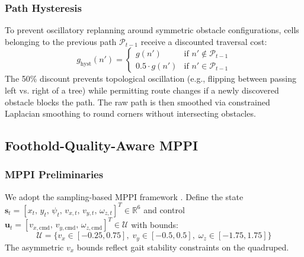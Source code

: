 \documentclass[letterpaper, 10 pt, conference]{ieeeconf}  %
\begin{document}
\subsubsection{Path Hysteresis}
To prevent oscillatory replanning around symmetric obstacle configurations, cells belonging to the previous path $\mathcal{P}_{t-1}$ receive a discounted traversal cost:
\begin{equation}
g_{\text{hyst}}(n') = \begin{cases} g(n') & \text{if } n' \notin \mathcal{P}_{t-1} \\ 0.5 \cdot g(n') & \text{if } n' \in \mathcal{P}_{t-1} \end{cases} \label{eq:hysteresis}
\end{equation}
The 50\% discount prevents topological oscillation (e.g., flipping between passing left vs. right of a tree) while permitting route changes if a newly discovered obstacle blocks the path. The raw path is then smoothed via constrained Laplacian smoothing to round corners without intersecting obstacles.
\subsection{Foothold-Quality-Aware MPPI}
\label{sec:mppi}
\subsubsection{MPPI Preliminaries}
We adopt the sampling-based MPPI framework \cite{Williams2016MPPI}. Define the state $\mathbf{s}_t = [x_t,\, y_t,\, \psi_t,\, v_{x,t},\, v_{y,t},\, \omega_{z,t}]^T \in \mathbb{R}^6$ and control $\mathbf{u}_t = [v_{x,\text{cmd}},\, v_{y,\text{cmd}},\, \omega_{z,\text{cmd}}]^T \in \mathcal{U}$ with bounds:
\begin{equation}
\mathcal{U} = \{v_x \in [-0.25, 0.75],\; v_y \in [-0.5, 0.5],\; \omega_z \in [-1.75, 1.75]\} \label{eq:bounds}
\end{equation}
The asymmetric $v_x$ bounds reflect gait stability constraints on the quadruped.
\end{document}
